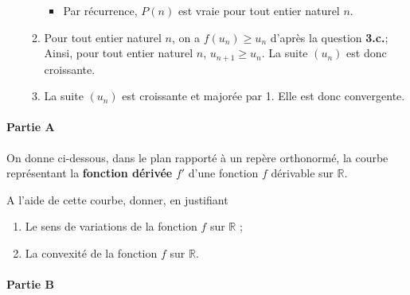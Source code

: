 \documentclass[11pt,fleqn, openany]{book} %
\begin{document}
\begin{solution}
\begin{enumerate}
\begin{enumerate}
\begin{itemize}
\item Par récurrence, $P(n)$ est vraie pour tout entier naturel $n$.
\end{itemize}
\item Pour tout entier naturel $n$, on a $f(u_n)\geqslant u_n$ d'après la question \textbf{3.c.}; Ainsi, pour tout entier naturel $n$, $u_{n+1}\geqslant u_n$. La suite $(u_n)$ est donc croissante.
\item La suite $(u_n)$ est croissante et majorée par 1. Elle est donc convergente.
\end{enumerate}
\end{enumerate}
\end{solution}





\begin{exercise}[topic=cvx04, subtitle={(Métropole 2021)}]

\paragraph{Partie A}

On donne ci-dessous, dans le plan rapporté à un repère orthonormé, la courbe représentant la\textbf{ fonction dérivée} $f'$ d'une fonction $f$ dérivable sur $\mathbb{R}$.

\begin{center}
\end{center}

A l'aide de cette courbe, donner, en justifiant
\begin{enumerate}
\item Le sens de variations de la fonction $f$ sur $\mathbb{R}$ ;
\item La convexité de la fonction $f$ sur $\mathbb{R}$.
\end{enumerate}


\paragraph{Partie B}


\end{exercise}
\end{document}
